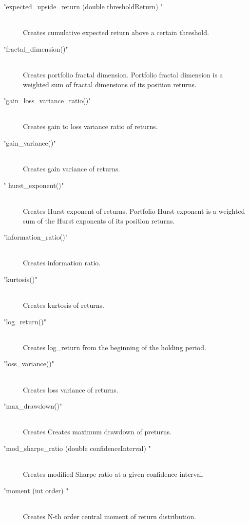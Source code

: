 \documentclass[letterpaper]{report}
\newcounter{N}
\begin{document}
\begin{description}
\item["expected\_upside\_return (double thresholdReturn) "] \hfill \\ 
Creates  cumulative expected return above a certain threshold.


\item["fractal\_dimension()"] \hfill \\ 
Creates portfolio fractal dimension.
Portfolio  fractal dimension  is  a weighted sum of fractal
 dimensions of its position returns.


\item["gain\_loss\_variance\_ratio()"] \hfill \\ 
Creates gain to loss variance ratio of returns.


\item["gain\_variance()"] \hfill \\ 
Creates gain variance of returns.


\item[" hurst\_exponent()"] \hfill \\ 
Creates  Hurst exponent of returns.
Portfolio Hurst exponent is a weighted sum of the Hurst exponents
 of its position returns.


\item["information\_ratio()"] \hfill \\ 
Creates information ratio.


\item["kurtosis()"] \hfill \\ 
Creates kurtosis of returns.


\item["log\_return()"] \hfill \\ 
Creates log\_return from the beginning of the holding period.


\item["loss\_variance()"] \hfill \\ 
Creates loss variance of returns.


\item["max\_drawdown()"] \hfill \\ 
Creates Creates maximum drawdown of preturns.


\item["mod\_sharpe\_ratio (double confidenceInterval) "] \hfill \\ 
Creates modified Sharpe ratio  at a given confidence
 interval.


\item["moment (int order) "] \hfill \\ 
Creates N-th order central moment of  return distribution.



\end{description}
\end{document}
